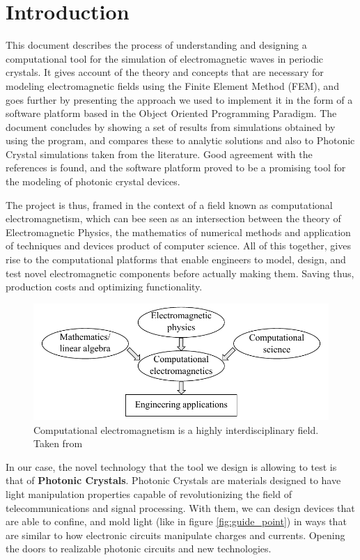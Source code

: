 \cleardoublepage {}
{}
\chapter*{Introduction}

This document describes the process of understanding and designing a computational tool for the simulation of electromagnetic waves in periodic crystals. It gives account of the  theory and concepts that are necessary for modeling electromagnetic fields using the Finite Element Method (FEM), and goes further by presenting the approach we used to implement it in the form of a software platform based in the Object Oriented Programming Paradigm. The document concludes by showing a set of results from simulations obtained by using the program, and compares these to analytic solutions and also to Photonic Crystal simulations taken from the literature. Good agreement with the references is found, and the software platform proved to be a promising tool for the modeling of photonic crystal devices.

The project is thus, framed in the context of a field known as computational electromagnetism, which can bee seen as an intersection between the theory of Electromagnetic Physics, the mathematics of numerical methods and application of techniques and devices product of computer science. All of this together, gives rise to the computational platforms that enable engineers to model, design, and test novel electromagnetic components before actually making them. Saving thus, production costs and optimizing functionality.  
\begin{figure}
\centering
\includegraphics[scale=1]{./img/interdisciplinary.pdf}
\caption{Computational electromagnetism is a highly interdisciplinary field. Taken from \cite{Jin2010}}
\label{fig:computational}
\end{figure}
In our case, the novel technology that the tool we design is allowing to test is that of \textbf{Photonic Crystals}. Photonic Crystals are materials designed to have light manipulation properties capable of revolutionizing the field of telecommunications and signal processing. With them, we can design devices that are able to confine, and mold light (like in figure \ref{fig:guide_point}) in ways that are similar to how electronic circuits manipulate charges and currents.  Opening the doors to realizable photonic circuits and new technologies.

